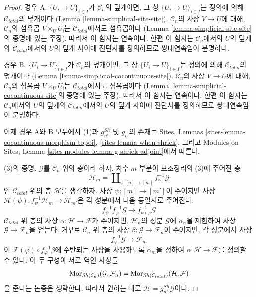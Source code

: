 \begin{proof}
경우 A. $\{U_i \to U\}_{i \in I}$가 $\mathcal{C}_n$의 덮개이면,
그 상 $\{U_i \to U\}_{i \in I}$는 정의에 의해
$\mathcal{C}_{total}$의 덮개이다
(Lemma \ref{lemma-simplicial-site-site}).
$\mathcal{C}_n$의 사상 $V \to U$에 대해, $\mathcal{C}_n$의 섬유곱
$V \times_U U_i$는 $\mathcal{C}_{total}$에서도 섬유곱이다
(Lemma \ref{lemma-simplicial-site-site}의 증명에 있는 주장).
따라서 이 함자는 연속이다. 한편 이 함자는 $\mathcal{C}_n$에서의
$U$의 덮개와 $\mathcal{C}_{total}$에서의 $U$의 덮개 사이에 전단사를
정의하므로 쌍대연속임이 분명하다.

\medskip\noindent
경우 B. $\{U_i \to U\}_{i \in I}$가 $\mathcal{C}_n$의 덮개이면,
그 상 $\{U_i \to U\}_{i \in I}$는 정의에 의해
$\mathcal{C}_{total}$의 덮개이다
(Lemma \ref{lemma-simplicial-cocontinuous-site}).
$\mathcal{C}_n$의 사상 $V \to U$에 대해, $\mathcal{C}_n$의 섬유곱
$V \times_U U_i$는 $\mathcal{C}_{total}$에서도 섬유곱이다
(Lemma \ref{lemma-simplicial-cocontinuous-site}의 증명에 있는 주장).
따라서 이 함자는 연속이다. 한편 이 함자는 $\mathcal{C}_n$에서의
$U$의 덮개와 $\mathcal{C}_{total}$에서의 $U$의 덮개 사이에 전단사를
정의하므로 쌍대연속임이 분명하다.

\medskip\noindent
이제 경우 A와 B 모두에서 (1)과 $g^{Sh}_{n!}$ 및 $g_{n!}$의 존재는
Sites, Lemmas \ref{sites-lemma-cocontinuous-morphism-topoi},
\ref{sites-lemma-when-shriek}, 그리고 Modules on Sites, Lemma
\ref{sites-modules-lemma-g-shriek-adjoint}에서 따른다.

\medskip\noindent
(3)의 증명. $\mathcal{G}$를 $\mathcal{C}_n$ 위의 층이라 하자.
차수 $m$ 부분이 보조정리의 (3)에 주어진 층
$$
\mathcal{H}_m = \coprod\nolimits_{\varphi : [n] \to [m]}
f_\varphi^{-1}\mathcal{G}
$$
인 $\mathcal{C}_{total}$ 위의 층 $\mathcal{H}$를 생각하자.
사상 $\psi : [m] \to [m']$이 주어지면 사상
$\mathcal{H}(\psi) : f_\psi^{-1}\mathcal{H}_m \to \mathcal{H}_{m'}$은
각 성분에서 다음 동일시로 주어진다.
$$
f_\psi^{-1} f_\varphi^{-1} \mathcal{G} \to
f_{\psi \circ \varphi}^{-1}\mathcal{G}
$$
$\mathcal{C}_{total}$ 위 층의 사상
$\alpha : \mathcal{H} \to \mathcal{F}$가 주어지면,
$\mathcal{H}_n$의 성분 $\mathcal{G}$에 $\alpha_n$을 제한하여
사상 $\mathcal{G} \to \mathcal{F}_n$을 얻는다.
거꾸로 $\mathcal{C}_n$ 위 층의 사상
$\beta : \mathcal{G} \to \mathcal{F}_n$이 주어지면,
각 성분에서 사상
$$
f_\varphi^{-1}\mathcal{G} \to \mathcal{F}_m
$$
이 $\mathcal{F}(\varphi) \circ f_\varphi^{-1}\beta$에 수반되는 사상을
사용하도록 $\alpha_m$을 정하여
$\alpha : \mathcal{H} \to \mathcal{F}$를 정의할 수 있다.
이 두 구성이 서로 역인 사상들
$$
\mathop{\mathrm{Mor}}\nolimits_{\mathop{\mathit{Sh}}\nolimits(\mathcal{C}_n)}(\mathcal{G}, \mathcal{F}_n) =
\mathop{\mathrm{Mor}}\nolimits_{\mathop{\mathit{Sh}}\nolimits(\mathcal{C}_{total})}(\mathcal{H}, \mathcal{F})
$$
을 준다는 논증은 생략한다.
따라서 원하는 대로 $\mathcal{H} = g^{Sh}_{n!}\mathcal{G}$이다.


\end{proof}
